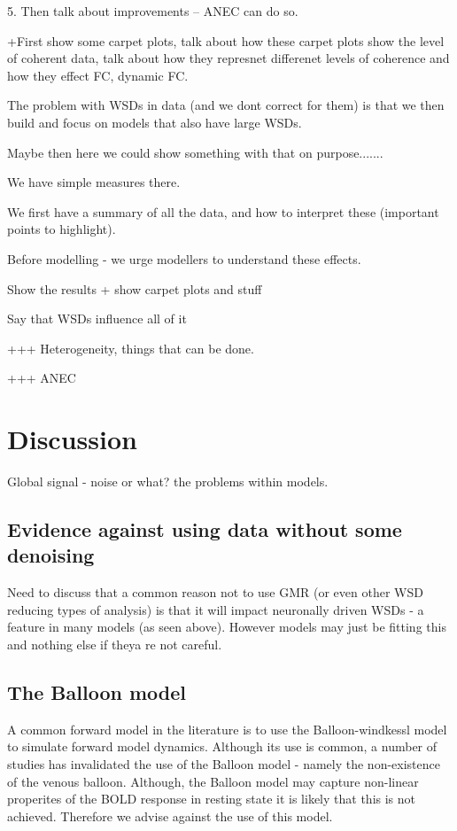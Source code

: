 \documentclass[oneside]{zHenriquesLab-StyleBioRxiv}
\begin{document}
5. Then talk about improvements -- ANEC can do so. 


+First show some carpet plots, talk about how these carpet plots show the level of coherent data, talk about how they represnet differenet levels of coherence and how they effect FC, dynamic FC.


The problem with WSDs in data (and we dont correct for them) is that we then build and focus on models that also have large WSDs. 

Maybe then here we could show something with that on purpose.......

We have simple measures there. 


We first have a summary of all the data, and how to interpret these (important points to highlight).

Before modelling - we urge modellers to understand these effects. 

Show the results + show carpet plots and stuff

Say that WSDs influence all of it


+++ Heterogeneity, things that can be done.

+++ ANEC 



\section*{Discussion}
Global signal - noise or what? the problems within models. 

\subsection*{Evidence against using data without some denoising} 
Need to discuss that a common reason not to use GMR (or even other WSD reducing types of analysis) is that it will impact neuronally driven WSDs - a feature in many models (as seen above). However models may just be fitting this and nothing else if theya re not careful. 

\subsection*{The Balloon model} 

A common forward model in the literature is to use the Balloon-windkessl model to simulate forward model dynamics. Although its use is common, a number of studies has invalidated the use of the Balloon model - namely the non-existence of the venous balloon. Although, the Balloon model may capture non-linear properites of the BOLD response in resting state it is likely that this is not achieved. Therefore we advise against the use of this model. 
\end{document}
